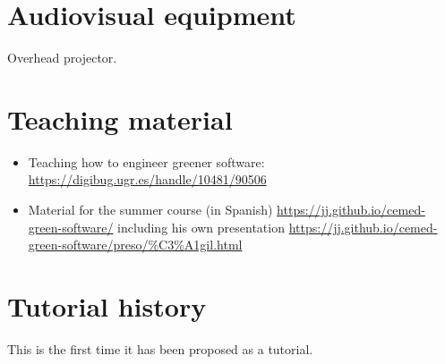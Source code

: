 \documentclass[a4paper]{article}
\begin{document}
\section{Audiovisual equipment}

Overhead projector.

\section{Teaching material}

\begin{itemize}
  \item Teaching how to engineer greener software:
    \url{https://digibug.ugr.es/handle/10481/90506}
  \item Material for the summer course (in Spanish)
    \url{https://jj.github.io/cemed-green-software/} including his own
    presentation
    \url{https://jj.github.io/cemed-green-software/preso/\%C3\%A1gil.html}
\end{itemize}

\section{Tutorial history}

    This is the first time it has been proposed as a tutorial.



\end{document}
